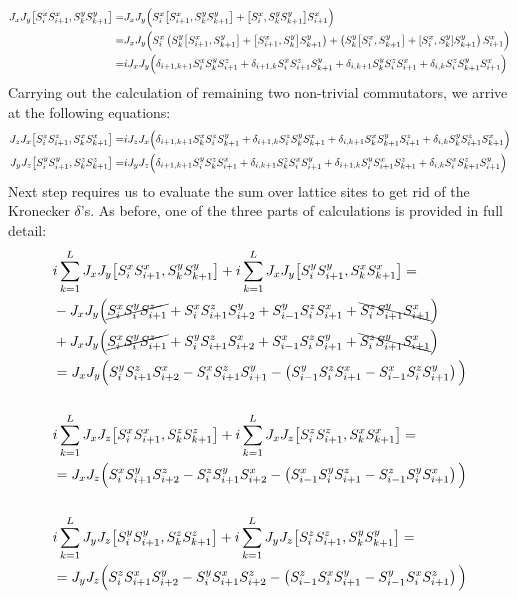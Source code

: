 \begin{align*}
    J_{x} J_{y}\comm{\Sx_{i}\Sx_{i+1}}{\Sy_{k}\Sy_{k+1}} =& J_x J_y \Big(\Sx_i\comm{\Sx_{i+1}}{\Sy_{k}\Sy_{k+1}} + \comm{\Sx_{i}}{\Sy_{k}\Sy_{k+1}} \Sx_{i+1} \Big)\\
    =& J_x J_y \Big( \Sx_i \left( \Sy_k \comm{\Sx_{i+1}}{\Sy_{k+1}} + \comm{\Sx_{i+1}}{\Sy_{k}} \Sy_{k+1}\right) + 
    \left( \Sy_k \comm{\Sx_{i}}{\Sy_{k+1}} + \comm{\Sx_{i}}{\Sy_{k}} \Sy_{k+1} \right)\Sx_{i+1} \Big)\\
    =& i J_x J_y \Big( \delta_{i+1,k+1} \Sx_i \Sy_k \Sz_{i+1} + \delta_{i+1,k} \Sx_i \Sz_{i+1} \Sy_{k+1} + \delta_{i,k+1} \Sy_k \Sz_i \Sx_{i+1} +\delta_{i,k} \Sz_i \Sy_{k+1} \Sx_{i+1}\Big)
\end{align*}
Carrying out the calculation of remaining two non-trivial commutators, we arrive at the following equations:
\begin{align*}
    J_{z} J_{x}\comm{\Sz_{i}\Sz_{i+1}}{\Sx_{k}\Sx_{k+1}} =& i J_z J_x \Big( \delta_{i+1,k+1} \Sx_k \Sz_i \Sy_{k+1} + \delta_{i+1,k} \Sz_i \Sy_{k} \Sx_{k+1} + \delta_{i,k+1} \Sx_k \Sy_{k+1} \Sz_{i+1} +\delta_{i,k} \Sy_k \Sz_{i+1} \Sx_{k+1}\Big)\\ 
    J_{y} J_{z}\comm{\Sy_{i}\Sy_{i+1}}{\Sz_{k}\Sz_{k+1}} =& i J_y J_z \Big( \delta_{i+1,k+1} \Sy_i \Sz_k \Sx_{i+1} + \delta_{i,k+1} \Sz_k \Sx_{i} \Sy_{i+1} + \delta_{i+1,k} \Sy_i \Sx_{i+1} \Sz_{k+1} +\delta_{i,k} \Sx_i \Sz_{k+1} \Sy_{i+1}\Big) 
\end{align*}
Next step requires us to evaluate the sum over lattice sites to get rid of the Kronecker \(\delta{}\)'s. As before, one of the three parts of calculations is provided in full detail:
\begin{align*}
&i\sum_{k=1}^{L}  J_{x} J_{y}\comm{\Sx_{i}\Sx_{i+1}}{\Sy_{k}\Sy_{k+1}} + i\sum_{k=1}^{L} J_{x} J_{y}\comm{\Sy_{i}\Sy_{i+1}}{\Sx_{k}\Sx_{k+1}} = \\
& - J_x J_y \Big( \cancel{\Sx_i \Sy_i \Sz_{i+1}} +  \Sx_i \Sz_{i+1} \Sy_{i+2} + \Sy_{i-1} \Sz_i \Sx_{i+1} +\bcancel{\Sz_i \Sy_{i+1} \Sx_{i+1}}\Big)\\
&+  J_x J_y \Big(  \cancel{\Sx_i \Sy_i \Sz_{i+1}} + \Sy_i \Sz_{i+1} \Sx_{i+2} + \Sx_{i-1} \Sz_i \Sy_{i+1} + \bcancel{\Sz_i \Sy_{i+1} \Sx_{i+1}}\Big)\\
&= J_x J_y \Big( \Sy_i \Sz_{i+1} \Sx_{i+2} - \Sx_i \Sz_{i+1} \Sy_{i+1} - \left(\Sy_{i-1}\Sz_i \Sx_{i+1} - \Sx_{i-1}\Sz_{i}\Sy_{i+1}\right) \Big)\\
\\
&i\sum_{k=1}^{L}  J_{x} J_{z}\comm{\Sx_{i}\Sx_{i+1}}{\Sz_{k}\Sz_{k+1}} + i\sum_{k=1}^{L} J_{x} J_{z}\comm{\Sz_{i}\Sz_{i+1}}{\Sx_{k}\Sx_{k+1}} = \\
&= J_x J_z \Big( \Sx_i \Sy_{i+1} \Sz_{i+2} - \Sz_i \Sy_{i+1} \Sx_{i+2} - \left(\Sx_{i-1}\Sy_i \Sz_{i+1} - \Sz_{i-1}\Sy_{i}\Sx_{i+1}\right) \Big)\\
\\
&i\sum_{k=1}^{L}  J_{y} J_{z}\comm{\Sy_{i}\Sy_{i+1}}{\Sz_{k}\Sz_{k+1}} + i\sum_{k=1}^{L} J_{y} J_{z}\comm{\Sz_{i}\Sz_{i+1}}{\Sy_{k}\Sy_{k+1}} = \\
&= J_y J_z \Big( \Sz_i \Sx_{i+1} \Sy_{i+2} - \Sy_i \Sx_{i+1} \Sz_{i+2} - \left(\Sz_{i-1}\Sx_i \Sy_{i+1} - \Sy_{i-1}\Sx_{i}\Sz_{i+1}\right) \Big)\\
\end{align*}
